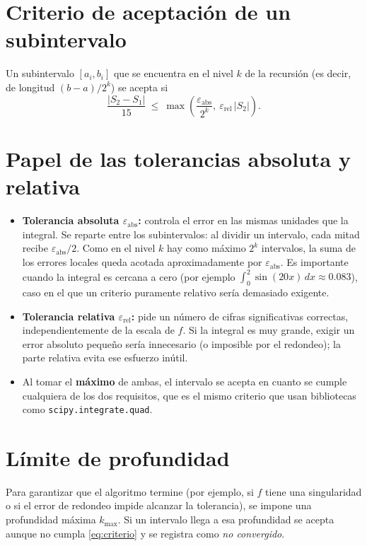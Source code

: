 \documentclass[11pt,letterpaper]{report}
\begin{document}
\section{Criterio de aceptación de un subintervalo}
Un subintervalo $[a_i,b_i]$ que se encuentra en el nivel $k$ de la recursión
(es decir, de longitud $(b-a)/2^k$) se acepta si
\begin{equation}
  \frac{|S_2-S_1|}{15}\ \le\ \max\!\left(\frac{\varepsilon_{\text{abs}}}{2^{k}},\ \varepsilon_{\text{rel}}\,|S_2|\right).
  \label{eq:criterio}
\end{equation}

\section{Papel de las tolerancias absoluta y relativa}
\begin{itemize}
  \item \textbf{Tolerancia absoluta $\varepsilon_{\text{abs}}$:} controla el error en
        las mismas unidades que la integral. Se reparte entre los subintervalos: al dividir
        un intervalo, cada mitad recibe $\varepsilon_{\text{abs}}/2$. Como en el nivel $k$
        hay como máximo $2^k$ intervalos, la suma de los errores locales queda acotada
        aproximadamente por $\varepsilon_{\text{abs}}$.
        Es importante cuando la integral es cercana a cero (por ejemplo $\int_0^2\sin(20x)\,dx\approx 0.083$),
        caso en el que un criterio puramente relativo sería demasiado exigente.
  \item \textbf{Tolerancia relativa $\varepsilon_{\text{rel}}$:} pide un número de cifras
        significativas correctas, independientemente de la escala de $f$. Si la integral es
        muy grande, exigir un error absoluto pequeño sería innecesario (o imposible por el
        redondeo); la parte relativa evita ese esfuerzo inútil.
  \item Al tomar el \textbf{máximo} de ambas, el intervalo se acepta en cuanto se cumple
        cualquiera de los dos requisitos, que es el mismo criterio que usan bibliotecas
        como \texttt{scipy.integrate.quad}.
\end{itemize}

\section{Límite de profundidad}
Para garantizar que el algoritmo termine (por ejemplo, si $f$ tiene una singularidad o si
el error de redondeo impide alcanzar la tolerancia), se impone una profundidad máxima
$k_{\max}$. Si un intervalo llega a esa profundidad se acepta aunque no cumpla
\eqref{eq:criterio} y se registra como \emph{no convergido}.
\end{document}
